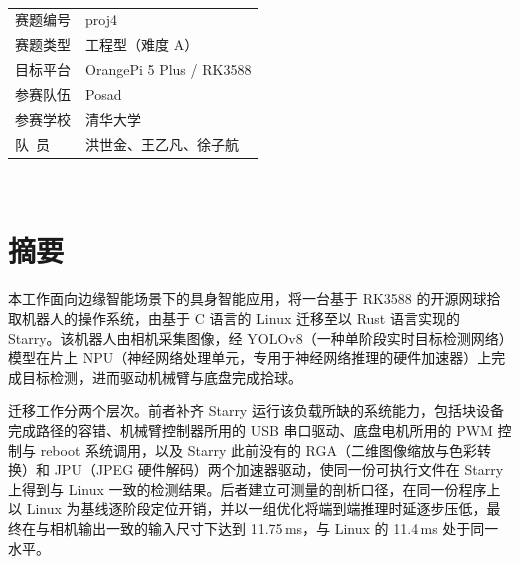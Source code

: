 \documentclass[11pt,a4paper]{ctexart}
\begin{document}
%
%
\begin{titlepage}
\thispagestyle{empty}
\sffamily
\vspace*{1.2cm}
\\[4pt]
\noindent{\color{rulecol}\rule{\textwidth}{1.2pt}}

\vspace{3.2cm}

\vspace{0.9cm}

\vspace{2.4cm}
\noindent\begin{tabular}{@{}ll@{}}
{\color{ink!75}赛题编号} & \quad proj4\\[5pt]
{\color{ink!75}赛题类型} & \quad 工程型\quad（难度 A）\\[5pt]
{\color{ink!75}目标平台} & \quad OrangePi 5 Plus / RK3588\\[5pt]
{\color{ink!75}参赛队伍} & \quad Posad\\[5pt]
{\color{ink!75}参赛学校} & \quad 清华大学\\[5pt]
{\color{ink!75}队\quad\ 员} & \quad 洪世金、王乙凡、徐子航\\[5pt]
\end{tabular}

\vfill
\noindent{\color{rulecol}\rule{\textwidth}{0.8pt}}\\[6pt]
\end{titlepage}

%
%
\section*{摘要}

本工作面向边缘智能场景下的具身智能应用，将一台基于 RK3588 的开源网球拾取机器人的操作系统，由基于 C 语言的 Linux 迁移至以 Rust 语言实现的 Starry。该机器人由相机采集图像，经 YOLOv8（一种单阶段实时目标检测网络）模型在片上 NPU（神经网络处理单元，专用于神经网络推理的硬件加速器）上完成目标检测，进而驱动机械臂与底盘完成拾球。

迁移工作分两个层次。前者补齐 Starry 运行该负载所缺的系统能力，包括块设备完成路径的容错、机械臂控制器所用的 USB 串口驱动、底盘电机所用的 PWM 控制与 reboot 系统调用，以及 Starry 此前没有的 RGA（二维图像缩放与色彩转换）和 JPU（JPEG 硬件解码）两个加速器驱动，使同一份可执行文件在 Starry 上得到与 Linux 一致的检测结果。后者建立可测量的剖析口径，在同一份程序上以 Linux 为基线逐阶段定位开销，并以一组优化将端到端推理时延逐步压低，最终在与相机输出一致的输入尺寸下达到 11.75\,ms，与 Linux 的 11.4\,ms 处于同一水平。
\end{document}
